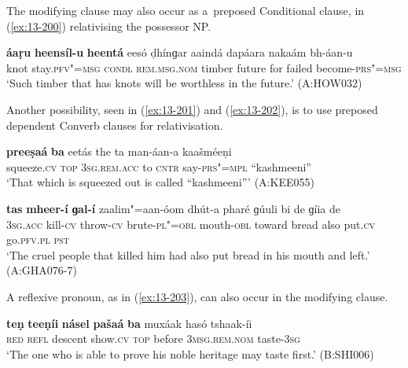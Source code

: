 The modifying clause may also occur as a~preposed Conditional clause, in (\ref{ex:13-200}) relativising the possessor NP.

\begin{exe}
\ex
\label{ex:13-200}
\gll \textbf{áaṛu} \textbf{heensíl-u} \textbf{heentá} eesó ḍhínɡar aaindá  dapáara nakaám bh-áan-u  \\
knot stay.\textsc{pfv"=msg} \textsc{condl} \textsc{rem.msg.nom} timber future  for failed become-\textsc{prs"=msg} \\
\glt `Such timber that has knots will be worthless in the future.' (A:HOW032) 
\end{exe}

Another possibility, seen in (\ref{ex:13-201}) and (\ref{ex:13-202}), is to use preposed dependent Converb clauses for relativisation.

\begin{exe}
\ex
\label{ex:13-201}
\gll \textbf{preeṣaá} \textbf{ba} eetás the ta man-áan-a kaašméeṇi \\
squeeze.\textsc{cv} \textsc{top} \textsc{3sg.rem.acc} to \textsc{cntr} say-\textsc{prs"=mpl} ``kashmeeni'' \\
\glt `That which is squeezed out is called ``kashmeeni''' (A:KEE055)

\ex
\label{ex:13-202}
\gll \textbf{tas} \textbf{mheer-í} \textbf{ɡal-í} zaalim"=aan-óom dhút-a  pharé ɡúuli bi de ɡíia de \\
\textsc{3sg.acc} kill-\textsc{cv} throw-\textsc{cv} brute-\textsc{pl"=obl} mouth-\textsc{obl}  toward bread also put.\textsc{cv} go.\textsc{pfv.pl} \textsc{pst} \\
\glt `The cruel people that killed him had also put bread in his mouth and left.' (A:GHA076-7) 
\end{exe}

A reflexive pronoun, as in (\ref{ex:13-203}), can also occur in the modifying clause. 

\begin{exe}
\ex
\label{ex:13-203}
\gll \textbf{teṇ} \textbf{teeṇíi} \textbf{násel} \textbf{pašaá} \textbf{ba} muxáak hasó  tshaak-íi \\
\textsc{red} \textsc{refl} descent show.\textsc{cv} \textsc{top} before \textsc{3msg.rem.nom}  taste-\textsc{3sg} \\
\glt `The one who is able to prove his noble heritage may taste first.' (B:SHI006) 
\end{exe}

